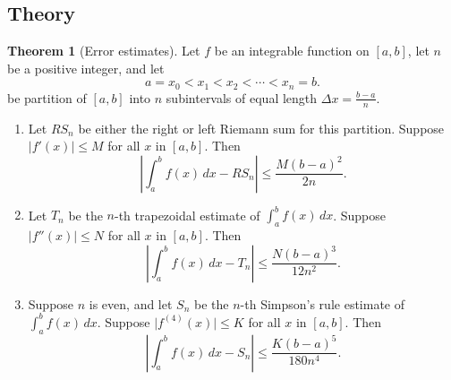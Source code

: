 \documentclass[11pt]{article}
\theoremstyle{definition}
\theoremstyle{named}
\newtheorem*{namedtheorem}{Theorem}
\numberwithin{myalgctr}{section}
\begin{document}
\subsection*{Theory}
\begin{namedtheorem}[Error estimates] Let $f$ be an integrable function on $[a,b]$, let $n$ be a positive integer, and let
  \[
  a=x_0< x_1< x_2<\cdots < x_n=b.
  \]
  be partition of $[a,b]$ into $n$ subintervals of equal length $\Delta x=\frac{b-a}{n}$.
  \begin{enumerate}
    \item Let $RS_n$ be either the right or left Riemann sum for this partition. Suppose $\vert f'(x)\vert \leq M$ for all $x$ in $[a,b]$. Then
    \[
    \left\vert\int_a^b f(x)\, dx - RS_n\right\vert\leq \frac{M(b-a)^2}{2n}.
    \]
    \item Let $T_n$ be the $n$-th trapezoidal estimate of $\int_a^b f(x)\, dx$. Suppose $\vert f''(x)\vert\leq N$ for all $x$ in $[a,b]$. Then
    \[
    \left\vert\int_a^b f(x)\, dx - T_n\right\vert\leq\frac{N(b-a)^3}{12n^2}.
    \]
    \item Suppose $n$ is even, and let $S_n$ be the $n$-th Simpson's rule estimate of $\int_a^bf(x)\, dx$. Suppose $\vert f^{(4)}(x)\vert\leq K$ for all $x$ in $[a,b]$. Then
    \[
    \left\vert\int_a^b f(x)\, dx - S_n\right\vert\leq\frac{K(b-a)^5}{180n^4}.
    \]
  \end{enumerate}

\end{namedtheorem}

\end{document}
